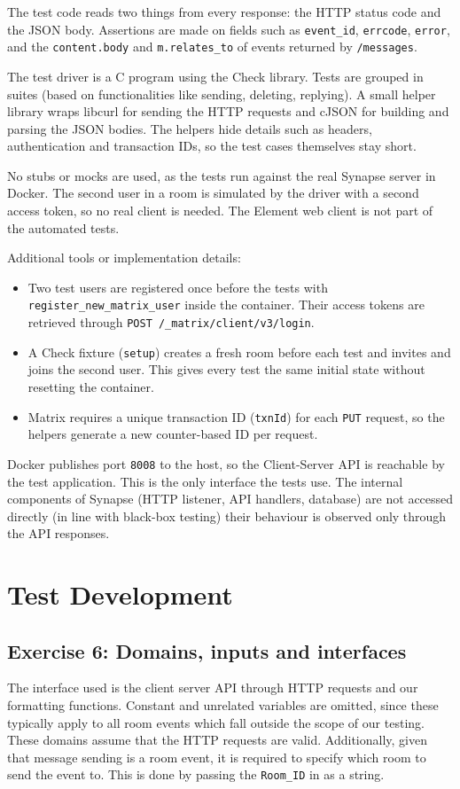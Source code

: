 \documentclass[a4paper]{article}
\begin{document}
	The test code reads two things from every response: the HTTP status code and the JSON body. Assertions are made on fields such as \texttt{event\_id}, \texttt{errcode}, \texttt{error}, and the \texttt{content.body} and \texttt{m.relates\_to} of events returned by \texttt{/messages}.
	
	The test driver is a C program using the Check library. Tests are grouped in suites (based on functionalities like sending, deleting, replying). A small helper library wraps libcurl for sending the HTTP requests and cJSON for building and parsing the JSON bodies. The helpers hide details such as headers, authentication and transaction IDs, so the test cases themselves stay short.
	
	No stubs or mocks are used, as the tests run against the real Synapse server in Docker. The second user in a room is simulated by the driver with a second access token, so no real client is needed. The Element web client is not part of the automated tests.
	
	Additional tools or implementation details:
	\begin{itemize}
		\item Two test users are registered once before the tests with \texttt{register\_new\_matrix\_user} inside the container. Their access tokens are retrieved through \texttt{POST /\_matrix/client/v3/login}.
		\item A Check fixture (\texttt{setup}) creates a fresh room before each test and invites and joins the second user. This gives every test the same initial state without resetting the container.
		\item Matrix requires a unique transaction ID (\texttt{txnId}) for each \texttt{PUT} request, so the helpers generate a new counter-based ID per request.
	\end{itemize}
	
	Docker publishes port \texttt{8008} to the host, so the Client-Server API is reachable by the test application. This is the only interface the tests use. The internal components of Synapse (HTTP listener, API handlers, database) are not accessed directly (in line with black-box testing) their behaviour is observed only through the API responses.
	
	\section{Test Development} \label{test-development}
	\subsection{Exercise 6: Domains, inputs and interfaces} \label{exercise-6-domains-inputs-and-interfaces}
	The interface used is the client server API through HTTP requests and our formatting functions. Constant and unrelated variables are omitted, since these typically apply to all room events which fall outside the scope of our testing. These domains assume that the HTTP requests are valid. Additionally, given that message sending is a room event, it is required to specify which room to send the event to. This is done by passing the \texttt{Room\_ID} in as a string.
	
\end{document}
